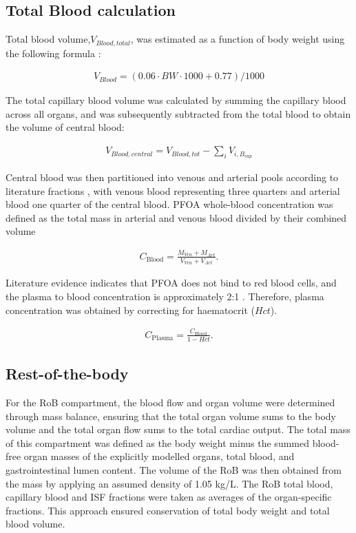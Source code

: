 \documentclass[preprint,12pt,authoryear]{elsarticle}
\begin{document}
 \subsection{Total Blood calculation}

Total blood volume,$V_{Blood,total} $, was estimated as a function of body weight  using the following formula \citep{lee_1985}: 

\begin{align}
V_{Blood} = (0.06 \cdot BW \cdot 1000+ 0.77)/1000  
\end{align}

The total capillary blood volume was calculated by summing the capillary blood across all organs, and was subsequently subtracted from the total blood to obtain the volume of central blood:

\begin{align}
V_{Blood,central} = V_{Blood,tot} -  \sum_i V_{i,B_{cap}}
\end{align}

Central blood was then partitioned into venous and arterial pools according to literature fractions \citep{brown_1997}, with venous blood representing three quarters and arterial blood one quarter of the central blood. PFOA whole-blood concentration was defined as the total mass in arterial and venous blood divided by their combined volume

\begin{align}
C_{\text{Blood}} = \frac{M_{Ven} + M_{Art}}{V_{Ven}+ V_{Art}} .
\end{align}

Literature evidence indicates that PFOA does not bind to red blood cells, and the plasma to blood concentration is approximately 2:1 \citep{ehresman_2007}. Therefore, plasma concentration was obtained by correcting for haematocrit ($Hct$). 

\begin{align}
C_{\text{Plasma}} = \frac{C_{\text{Blood}}}{1 - Hct}.
\end{align}

 \subsection{Rest-of-the-body}


For the RoB compartment, the blood flow and organ volume were determined through mass balance, ensuring that the total organ volume sums to the body volume and the total organ flow sums to the total cardiac output. The total mass of this compartment was defined as the body weight minus the summed blood-free organ masses of the explicitly modelled organs, total blood, and gastrointestinal lumen content. The volume of the RoB was then obtained from the mass by applying an assumed density of 1.05 kg/L. The RoB total blood, capillary blood and ISF fractions were taken as averages of the organ-specific fractions. This approach ensured conservation of total body weight and total blood volume.
\end{document}
